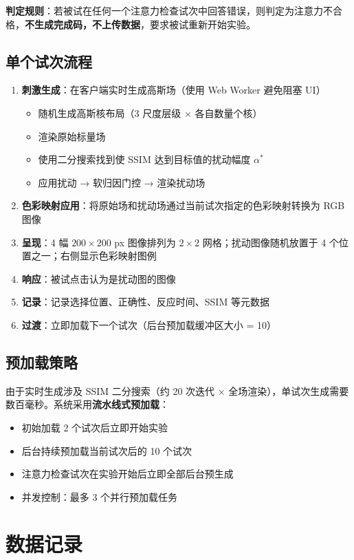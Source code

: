 \documentclass{article}
\begin{document}
\textbf{判定规则}：若被试在任何一个注意力检查试次中回答错误，则判定为注意力不合格，\textbf{不生成完成码，不上传数据}，要求被试重新开始实验。

\subsection{单个试次流程}

\begin{enumerate}
    \item \textbf{刺激生成}：在客户端实时生成高斯场（使用 Web Worker 避免阻塞 UI）
    \begin{itemize}
        \item 随机生成高斯核布局（3 尺度层级 × 各自数量个核）
        \item 渲染原始标量场
        \item 使用二分搜索找到使 SSIM 达到目标值的扰动幅度 $\alpha^*$
        \item 应用扰动 → 软归因门控 → 渲染扰动场
    \end{itemize}
    \item \textbf{色彩映射应用}：将原始场和扰动场通过当前试次指定的色彩映射转换为 RGB 图像
    \item \textbf{呈现}：4 幅 $200 \times 200$ px 图像排列为 $2 \times 2$ 网格；扰动图像随机放置于 4 个位置之一；右侧显示色彩映射图例
    \item \textbf{响应}：被试点击认为是扰动图的图像
    \item \textbf{记录}：记录选择位置、正确性、反应时间、SSIM 等元数据
    \item \textbf{过渡}：立即加载下一个试次（后台预加载缓冲区大小 = 10）
\end{enumerate}

\subsection{预加载策略}
由于实时生成涉及 SSIM 二分搜索（约 20 次迭代 × 全场渲染），单试次生成需要数百毫秒。系统采用\textbf{流水线式预加载}：
\begin{itemize}
    \item 初始加载 2 个试次后立即开始实验
    \item 后台持续预加载当前试次后的 10 个试次
    \item 注意力检查试次在实验开始后立即全部后台预生成
    \item 并发控制：最多 3 个并行预加载任务
\end{itemize}


\section{数据记录}
\end{document}
